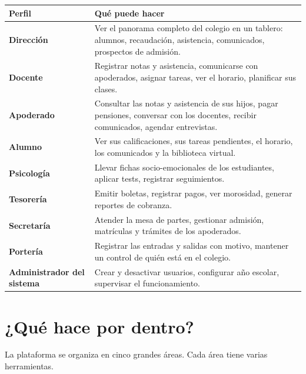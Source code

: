 \documentclass[11pt,a4paper]{article}
\begin{document}
\begin{tabularx}{\textwidth}{@{}lX@{}}
\toprule
\textbf{Perfil} & \textbf{Qué puede hacer} \\
\midrule
\textcolor{merBlue}{\textbf{Dirección}} &
Ver el panorama completo del colegio en un tablero: alumnos, recaudación, asistencia, comunicados, prospectos de admisión. \\
\addlinespace
\textcolor{merBlue}{\textbf{Docente}} &
Registrar notas y asistencia, comunicarse con apoderados, asignar tareas, ver el horario, planificar sus clases. \\
\addlinespace
\textcolor{merBlue}{\textbf{Apoderado}} &
Consultar las notas y asistencia de sus hijos, pagar pensiones, conversar con los docentes, recibir comunicados, agendar entrevistas. \\
\addlinespace
\textcolor{merBlue}{\textbf{Alumno}} &
Ver sus calificaciones, sus tareas pendientes, el horario, los comunicados y la biblioteca virtual. \\
\addlinespace
\textcolor{merBlue}{\textbf{Psicología}} &
Llevar fichas socio-emocionales de los estudiantes, aplicar tests, registrar seguimientos. \\
\addlinespace
\textcolor{merBlue}{\textbf{Tesorería}} &
Emitir boletas, registrar pagos, ver morosidad, generar reportes de cobranza. \\
\addlinespace
\textcolor{merBlue}{\textbf{Secretaría}} &
Atender la mesa de partes, gestionar admisión, matrículas y trámites de los apoderados. \\
\addlinespace
\textcolor{merBlue}{\textbf{Portería}} &
Registrar las entradas y salidas con motivo, mantener un control de quién está en el colegio. \\
\addlinespace
\textcolor{merBlue}{\textbf{Administrador del sistema}} &
Crear y desactivar usuarios, configurar año escolar, supervisar el funcionamiento. \\
\bottomrule
\end{tabularx}

\section{¿Qué hace por dentro?}

La plataforma se organiza en cinco grandes áreas. Cada área tiene varias herramientas.

\end{document}
